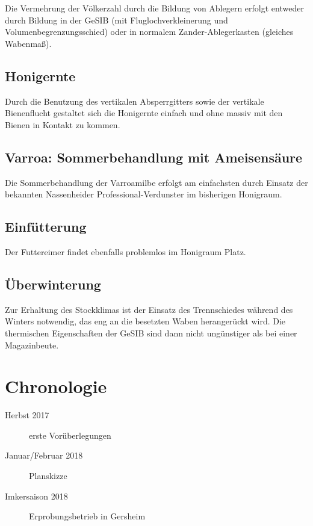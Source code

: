 \documentclass[12pt,a4paper,ngerman]{scrartcl}
\begin{document}
Die Vermehrung der Völkerzahl durch die Bildung von Ablegern erfolgt 
entweder durch Bildung in der GeSIB (mit Fluglochverkleinerung und Volumenbegrenzungsschied)
oder in normalem Zander-Ablegerkasten (gleiches Wabenmaß).


\subsection{Honigernte}

Durch die Benutzung des vertikalen Absperrgitters sowie 
der vertikale Bienenflucht
gestaltet sich die Honigernte einfach und ohne massiv mit den Bienen in Kontakt zu kommen.


\subsection{Varroa: Sommerbehandlung mit Ameisensäure}

Die Sommerbehandlung der Varroamilbe erfolgt am einfachsten durch Einsatz der bekannten
Nassenheider Professional-Verdunster im bisherigen Honigraum.


\subsection{Einfütterung}

Der Futtereimer findet ebenfalls problemlos im Honigraum Platz.


\subsection{Überwinterung}

Zur Erhaltung des Stockklimas ist der Einsatz des Trennschiedes während des Winters notwendig, das eng an die besetzten Waben herangerückt wird.
Die thermischen Eigenschaften der GeSIB sind dann nicht ungünstiger als bei einer Magazinbeute.


\section{Chronologie}

\begin{description}
\item[Herbst 2017] erste Vorüberlegungen
\item[Januar/Februar 2018] Planskizze
\item[Imkersaison 2018] Erprobungsbetrieb in Gersheim
\end{description}
\end{document}
